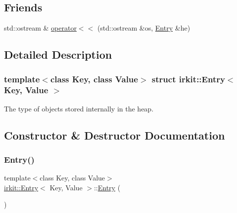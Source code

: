 \subsection*{Friends}
\begin{DoxyCompactItemize}
\item 
std\+::ostream \& \hyperlink{structirkit_1_1Entry_a885f1645de32df3dbfbf9f2f47f7ea1f}{operator$<$$<$} (std\+::ostream \&os, \hyperlink{structirkit_1_1Entry}{Entry} \&he)
\end{DoxyCompactItemize}


\subsection{Detailed Description}
\subsubsection*{template$<$class Key, class Value$>$\newline
struct irkit\+::\+Entry$<$ Key, Value $>$}

The type of objects stored internally in the heap. 

\subsection{Constructor \& Destructor Documentation}
\mbox{\label{structirkit_1_1Entry_ab8d6ae4f3f3ff0c1934543f2eca895ea}} 
\subsubsection{\texorpdfstring{Entry()}{Entry()}\hspace{0.1cm}{\footnotesize\ttfamily [1/2]}}
{\footnotesize\ttfamily template$<$class Key, class Value$>$ \\
\hyperlink{structirkit_1_1Entry}{irkit\+::\+Entry}$<$ Key, Value $>$\+::\hyperlink{structirkit_1_1Entry}{Entry} (\begin{DoxyParamCaption}{ }\end{DoxyParamCaption})\hspace{0.3cm}{\ttfamily [default]}}

\mbox{\label{structirkit_1_1Entry_afe9a7f9975902c4622115176169bc80a}} 
